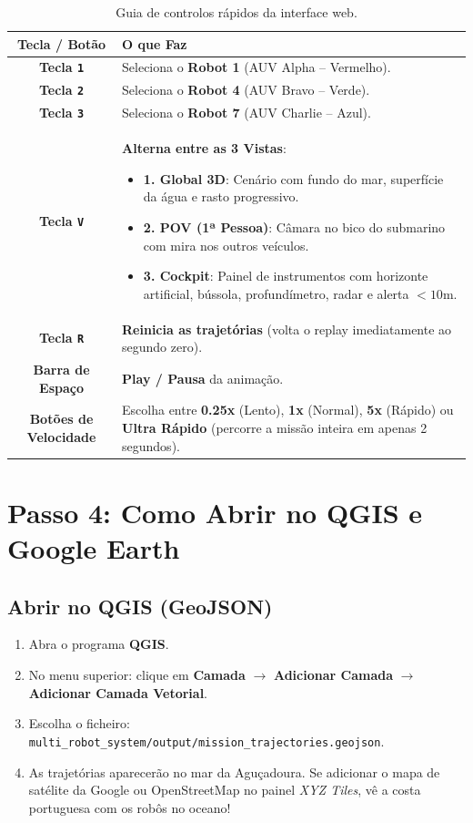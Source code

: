 \documentclass[11pt,a4paper]{article}
\begin{document}
\begin{table}[H]
\centering
\begin{tabular}{cp{10.5cm}}
\toprule
\textbf{Tecla / Botão} & \textbf{O que Faz} \\
\midrule
\textbf{Tecla \texttt{1}} & Seleciona o \textbf{Robot 1} (AUV Alpha -- Vermelho). \\
\textbf{Tecla \texttt{2}} & Seleciona o \textbf{Robot 4} (AUV Bravo -- Verde). \\
\textbf{Tecla \texttt{3}} & Seleciona o \textbf{Robot 7} (AUV Charlie -- Azul). \\
\addlinespace
\textbf{Tecla \texttt{V}} & \textbf{Alterna entre as 3 Vistas}:
\begin{itemize}[nosep]
    \item \textbf{1. Global 3D}: Cenário com fundo do mar, superfície da água e rasto progressivo.
    \item \textbf{2. POV (1ª Pessoa)}: Câmara no bico do submarino com mira nos outros veículos.
    \item \textbf{3. Cockpit}: Painel de instrumentos com horizonte artificial, bússola, profundímetro, radar e alerta $<10\text{m}$.
\end{itemize} \\
\addlinespace
\textbf{Tecla \texttt{R}} & \textbf{Reinicia as trajetórias} (volta o replay imediatamente ao segundo zero). \\
\textbf{Barra de Espaço} & \textbf{Play / Pausa} da animação. \\
\addlinespace
\textbf{Botões de Velocidade} & Escolha entre \textbf{0.25x} (Lento), \textbf{1x} (Normal), \textbf{5x} (Rápido) ou \textbf{Ultra Rápido} (percorre a missão inteira em apenas 2 segundos). \\
\bottomrule
\end{tabular}
\caption{Guia de controlos rápidos da interface web.}
\end{table}

\section{Passo 4: Como Abrir no QGIS e Google Earth}

\subsection{Abrir no QGIS (GeoJSON)}
\begin{enumerate}[nosep]
    \item Abra o programa \textbf{QGIS}.
    \item No menu superior: clique em \textbf{Camada} $\to$ \textbf{Adicionar Camada} $\to$ \textbf{Adicionar Camada Vetorial}.
    \item Escolha o ficheiro: \texttt{multi\_robot\_system/output/mission\_trajectories.geojson}.
    \item As trajetórias aparecerão no mar da Aguçadoura. Se adicionar o mapa de satélite da Google ou OpenStreetMap no painel \textit{XYZ Tiles}, vê a costa portuguesa com os robôs no oceano!
\end{enumerate}
\end{document}
